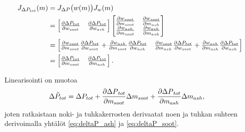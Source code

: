 \begin{align}
    \begin{split}
        J_{\Delta P_{tot}}(m)&=
        J_{\Delta P}\big(w(m)\big)  J_{w}(m)
\\ &=
    \begin{bmatrix}   
        \frac{\partial \Delta P_{tot}}{\partial w_{soot}}
        &   
        \frac{\partial \Delta P_{tot}}{\partial w_{ash}}
         \end{bmatrix}
    \begin{bmatrix} 
        \frac{\partial w_{soot}}{\partial m_{soot}} & \frac{\partial w_{soot}}{\partial m_{ash}}
        \\ 
        \frac{\partial w_{ash}}{\partial m_{soot}} & \frac{\partial w_{ash}}{\partial m_{ash}}
         \end{bmatrix}
\\ &=
    \begin{bmatrix} 
        \frac{\partial w_{soot}}{\partial m_{soot}}
        \frac{\partial \Delta P_{tot}}{\partial w_{soot}}
        +
        \frac{\partial w_{ash}}{\partial m_{soot}}
        \frac{\partial \Delta P_{tot}}{\partial w_{ash}}
        &
        \frac{\partial w_{soot}}{\partial m_{ash}}
        \frac{\partial \Delta P_{tot}}{\partial w_{soot}}
        +
        \frac{\partial w_{ash}}{\partial m_{ash}}
        \frac{\partial \Delta P_{tot}}{\partial w_{ash}}
     \end{bmatrix} 
\\ &= 
    \begin{bmatrix} \frac{\partial \Delta P_{tot}}{\partial m_{soot}} 
        & \frac{\partial \Delta P_{tot}}{\partial m_{ash}} \end{bmatrix}.
    \end{split}
\end{align}

Linearisointi on muotoa
\begin{align}
    \begin{split}
    \Delta\tilde{ P}_{tot} &= \Delta P_{tot}
    +
    \frac{\partial {\Delta P}_{tot}}{\partial m_{soot}} \Delta m_{soot}
    + 
    \frac{\partial {\Delta P}_{tot}}{\partial m_{ash}}  \Delta m_{ash},
\end{split}
\end{align}
joten ratkaistaan noki- ja tuhkakerrosten derivaatat noen ja tuhkan suhteen derivoimalla yhtälöt \eqref{eq:deltaP_ash} ja \eqref{eq:deltaP_soot}.

